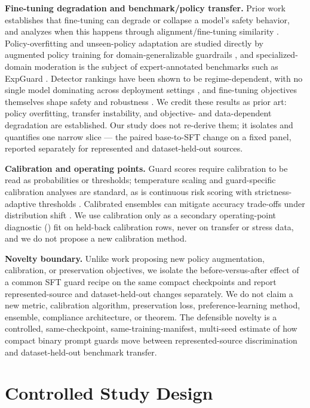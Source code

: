 \documentclass[sigconf,nonacm]{acmart}
\begin{document}
\textbf{Fine-tuning degradation and benchmark/policy transfer.} Prior work establishes that fine-tuning can degrade or collapse a model's safety behavior, and analyzes when this happens through alignment/fine-tuning similarity \cite{hsiung2025guardrails}. Policy-overfitting and unseen-policy adaptation are studied directly by augmented policy training for domain-generalizable guardrails \cite{liu2026domaingeneralizable}, and specialized-domain moderation is the subject of expert-annotated benchmarks such as ExpGuard \cite{expguard2026}. Detector rankings have been shown to be regime-dependent, with no single model dominating across deployment settings \cite{akinrele2026regime}, and fine-tuning objectives themselves shape safety and robustness \cite{vennemeyer2026objective}. We credit these results as prior art: policy overfitting, transfer instability, and objective- and data-dependent degradation are established. Our study does not re-derive them; it isolates and quantifies one narrow slice --- the paired base-to-SFT change on a fixed panel, reported separately for represented and dataset-held-out sources.

\textbf{Calibration and operating points.} Guard scores require calibration to be read as probabilities or thresholds; temperature scaling \cite{guo2017calibration} and guard-specific calibration analyses \cite{liu2025calibration} are standard, as is continuous risk scoring with strictness-adaptive thresholds \cite{flexguard2026}. Calibrated ensembles can mitigate accuracy trade-offs under distribution shift \cite{kumar2022calibrated}. We use calibration only as a secondary operating-point diagnostic () fit on held-back calibration rows, never on transfer or stress data, and we do not propose a new calibration method.

\textbf{Novelty boundary.} Unlike work proposing new policy augmentation, calibration, or preservation objectives, we isolate the before-versus-after effect of a common SFT guard recipe on the same compact checkpoints and report represented-source and dataset-held-out changes separately. We do not claim a new metric, calibration algorithm, preservation loss, preference-learning method, ensemble, compliance architecture, or theorem. The defensible novelty is a controlled, same-checkpoint, same-training-manifest, multi-seed estimate of how compact binary prompt guards move between represented-source discrimination and dataset-held-out benchmark transfer.

\section{Controlled Study Design}
\label{sec:design}
\end{document}
